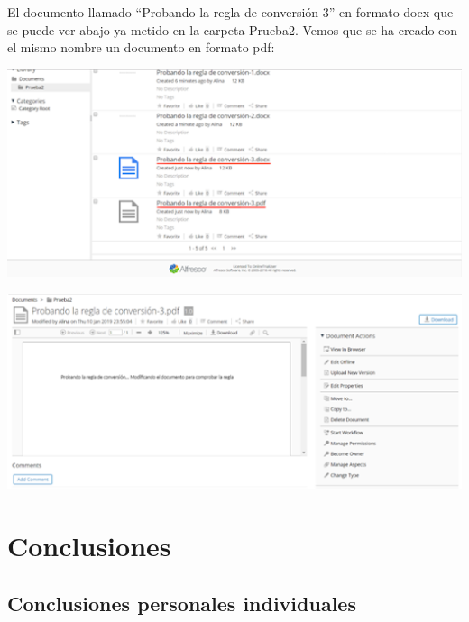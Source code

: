 \documentclass{article}
\begin{document}
El documento llamado “Probando la regla de conversión-3” en formato docx que se puede ver abajo ya metido en la carpeta Prueba2.
Vemos que se ha creado con el mismo nombre un documento en formato pdf:

\begin{center}
\includegraphics[scale=0.7]{images/pdf.png}
\end{center}

\begin{center}
\includegraphics[scale=0.7]{images/conversion.png}
\end{center}

\section{Conclusiones}

\subsection{Conclusiones personales individuales}
\end{document}
